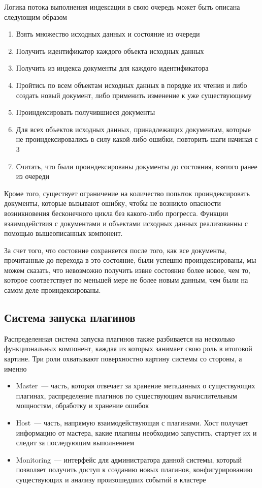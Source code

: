 Логика потока выполнения индексации в свою очередь может быть описана следующим образом

\begin{enumerate}
	\item Взять множество исходных данных и состояние из очереди
	\item Получить идентификатор каждого объекта исходных данных
	\item Получить из индекса документы для каждого идентификатора
	\item Пройтись по всем объектам исходных данных в порядке их чтения и либо создать новый документ, либо применить изменение к уже существующему
	\item Проиндексировать получившиеся документы
	\item Для всех объектов исходных данных, принадлежащих документам, которые не проиндексировались в силу какой-либо ошибки, повторить шаги начиная с 3
	\item Считать, что были проиндексированы документы до состояния, взятого ранее из очереди
\end{enumerate}

Кроме того, существует ограничение на количество попыток проиндексировать документы, которые вызывают ошибку, чтобы не возникло опасности возникновения бесконечного цикла без какого-либо прогресса. Функции взаимодействия с документами и объектами исходных данных реализованны с помощью вышеописанных компонент.

За счет того, что состояние сохраняется после того, как все документы, прочитанные до перехода в это состояние, были успешно проиндексированы, мы можем сказать, что невозможно получить извне состояние более новое, чем то, которое соответствует по меньшей мере не более новым данным, чем были на самом деле проиндексированы.

\subsection{Система запуска плагинов}

Распределенная система запуска плагинов также разбивается на несколько функциональных компонент, каждая из которых занимает свою роль в итоговой картине. Три роли охватывают поверхностно картину системы со стороны, а именно

\begin{itemize}
	\item Master~--- часть, которая отвечает за хранение метаданных о существующих плагинах, распределение плагинов по существующим вычислительным мощностям, обработку и хранение ошибок
	\item Host~--- часть, напрямую взаимодействующая с плагинами. Хост получает информацию от мастера, какие плагины необходимо запустить, стартует их и следит за последующим выполнением
	\item Monitoring~--- интерфейс для администратора данной системы, который позволяет получить доступ к созданию новых плагинов, конфигурированию существующих и анализу произошедших событий в кластере
\end{itemize}

